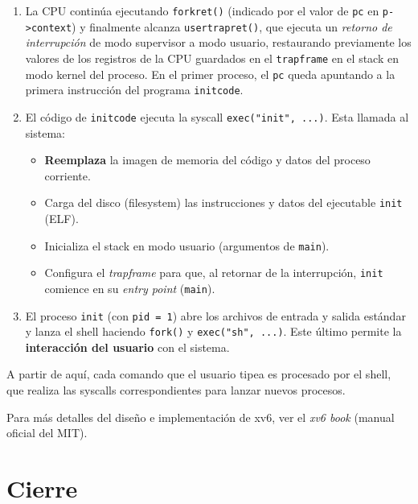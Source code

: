 \documentclass[11pt,a4paper]{article}
\begin{document}
\begin{enumerate}[leftmargin=*]
    \item La CPU continúa ejecutando \texttt{forkret()} (indicado por
        el valor de \texttt{pc} en \verb|p->context|) y finalmente
        alcanza \texttt{usertrapret()}, que ejecuta un \emph{retorno
        de interrupción} de modo supervisor a modo usuario,
        restaurando previamente los valores de los registros de la
        CPU guardados en el \texttt{trapframe} en el stack en modo
        kernel del proceso. En el primer proceso, el \texttt{pc}
        queda apuntando a la primera instrucción del programa
        \texttt{initcode}.

    \item El código de \texttt{initcode} ejecuta la syscall
        \verb|exec("init", ...)|. Esta llamada al sistema:
        \begin{itemize}[leftmargin=*,nosep]
            \item \textbf{Reemplaza} la imagen de memoria del código
                y datos del proceso corriente.
            \item Carga del disco (filesystem) las instrucciones y
                datos del ejecutable \texttt{init} (ELF).
            \item Inicializa el stack en modo usuario (argumentos de
                \texttt{main}).
            \item Configura el \emph{trapframe} para que, al retornar
                de la interrupción, \texttt{init} comience en su
                \emph{entry point} (\texttt{main}).
        \end{itemize}

    \item El proceso \texttt{init} (con \texttt{pid = 1}) abre los
        archivos de entrada y salida estándar y lanza el shell
        haciendo \texttt{fork()} y \verb|exec("sh", ...)|. Este
        último permite la \textbf{interacción del usuario} con el
        sistema.
\end{enumerate}

A partir de aquí, cada comando que el usuario tipea es procesado por
el shell, que realiza las syscalls correspondientes para lanzar
nuevos procesos.

\begin{idea}
Para más detalles del diseño e implementación de xv6, ver el
\emph{xv6 book} (manual oficial del MIT).
\end{idea}

\section{Cierre}
\end{document}
